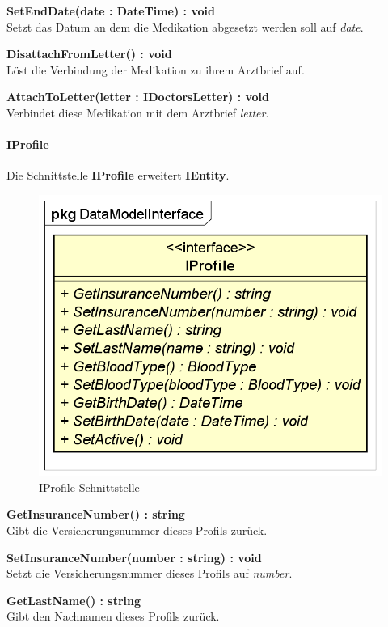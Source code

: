 \documentclass[a4paper]{scrreprt}
\begin{document}
\textbf{SetEndDate(date : DateTime) : void}\\
Setzt das Datum an dem die Medikation abgesetzt werden soll auf \textit{date}.

\textbf{DisattachFromLetter() : void}\\
Löst die Verbindung der Medikation zu ihrem Arztbrief auf.

\textbf{AttachToLetter(letter : IDoctorsLetter) : void}\\
Verbindet diese Medikation mit dem Arztbrief \textit{letter}.


\paragraph{IProfile}
Die Schnittstelle \textbf{IProfile} erweitert \textbf{IEntity}.

\begin{figure}[H]
\centering
\includegraphics[width=0.55\textheight]{graphics/Klassendiagramme/Model/IProfile.png}
\caption{IProfile Schnittstelle}
\end{figure}
\textbf{GetInsuranceNumber() : string}\\
Gibt die Versicherungsnummer dieses Profils zurück.

\textbf{SetInsuranceNumber(number : string) : void}\\
Setzt die Versicherungsnummer dieses Profils auf \textit{number}.

\textbf{GetLastName() : string}\\
Gibt den Nachnamen dieses Profils zurück.
\end{document}
